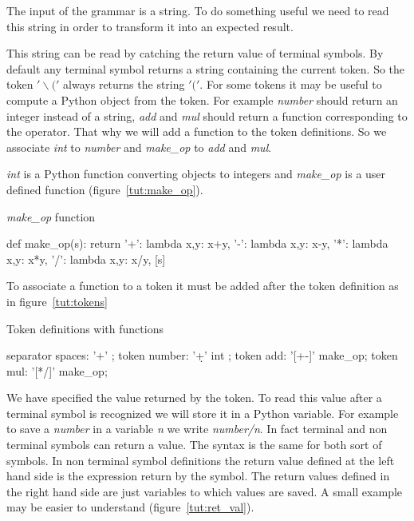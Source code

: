 The input of the grammar is a string. To do something useful we need to read this string in order to transform it into an expected result.

This string can be read by catching the return value of terminal symbols. By default any terminal symbol returns a string containing the current token. So the token $'\backslash('$ always returns the string $'('$. For some tokens it may be useful to compute a Python object from the token. For example \emph{number} should return an integer instead of a string, \emph{add} and \emph{mul} should return a function corresponding to the operator. That why we will add a function to the token definitions. So we associate \emph{int} to \emph{number} and \emph{make\_op} to \emph{add} and \emph{mul}.

\emph{int} is a Python function converting objects to integers and \emph{make\_op} is a user defined function (figure~\ref{tut:make_op}).

\begin{code}
\caption{\emph{make\_op} function}                          \label{tut:make_op}
\begin{verbatimtab}[4]
def make_op(s):
    return {
        '+': lambda x,y: x+y,
        '-': lambda x,y: x-y,
        '*': lambda x,y: x*y,
        '/': lambda x,y: x/y,
    }[s]
\end{verbatimtab}
\end{code}

To associate a function to a token it must be added after the token definition as in figure~\ref{tut:tokens}

\begin{code}
\caption{Token definitions with functions}                  \label{tut:tokens}
\begin{verbatimtab}[4]
    separator spaces: '\s+' ;
    token number: '\d+' int ;
    token add: '[+-]' make_op;
    token mul: '[*/]' make_op;
\end{verbatimtab}
\end{code}

We have specified the value returned by the token. To read this value after a terminal symbol is recognized we will store it in a Python variable. For example to save a \emph{number} in a variable \emph{n} we write \emph{number/n}.
In fact terminal and non terminal symbols can return a value. The syntax is the same for both sort of symbols. In non terminal symbol definitions the return value defined at the left hand side is the expression return by the symbol. The return values defined in the right hand side are just variables to which values are saved. A small example may be easier to understand (figure~\ref{tut:ret_val}).

